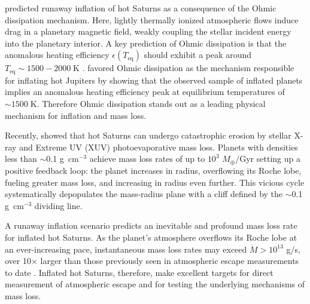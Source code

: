 \documentclass[twocolumn]{aastex631}
\begin{document}
\citet{2011ApJ...738....1B} predicted runaway inflation of hot Saturns as a consequence of the Ohmic dissipation mechanism.  Here, lightly thermally ionized atmospheric flows induce drag in a planetary magnetic field, weakly coupling the stellar incident energy into the planetary interior.  A key prediction of Ohmic dissipation is that the anomalous heating efficiency $\epsilon(T_\mathrm{eq})$ should exhibit a peak around $T_\mathrm{eq}\sim1500-2000\;$K \citep{2012ApJ...745..138M,2014ApJ...794..132R,2016ApJ...819..116G}. \citet{2018AJ....155..214T} favored Ohmic dissipation as the mechanism responsible for inflating hot Jupiters by showing that the observed sample of inflated planets implies an anomalous heating efficiency peak at equilibrium temperatures of $\sim1500\;$K.  Therefore Ohmic dissipation stands out as a leading physical mechanism for inflation and mass loss.

Recently, \citet{2023ApJ...945L..36T} showed that hot Saturns can undergo catastrophic erosion by stellar X-ray and Extreme UV (XUV) photoevaporative mass loss. Planets with densities less than $\sim$0.1 g~cm$^{-3}$ achieve mass loss rates of up to $10^3$ $M_\oplus /$Gyr setting up a positive feedback loop: the planet increases in radius, overflowing its Roche lobe, fueling greater mass loss, and increasing in radius even further.  This vicious cycle systematically depopulates the mass-radius plane with a cliff defined by the $\sim$0.1 g~cm$^{-3}$ dividing line.

A runaway inflation scenario predicts an inevitable and profound mass loss rate for inflated hot Saturns.  As the planet's atmosphere overflows its Roche lobe at an ever-increasing pace, instantaneous mass loss rates may exceed $\dot{M}>10^{13}$ g/s, over 10$\times$ larger than those previously seen in atmospheric escape measurements to date \citep{2022arXiv221116243D}.  Inflated hot Saturns, therefore, make excellent targets for direct measurement of atmospheric escape and for testing the underlying mechanisms of mass loss.
\end{document}
